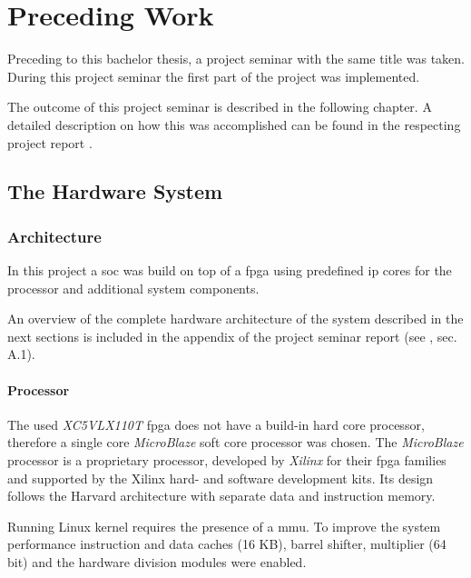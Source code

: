 \chapter{Preceding Work}
\label{cha:preceding}

Preceding to this bachelor thesis, a project seminar with the same title was taken. During this project seminar the first part of the project was implemented.

The outcome of this project seminar is described in the following chapter. A detailed description on how this was accomplished can be found in the respecting project report \cite{projectseminar}.
\\

\section{The Hardware System}

\subsection{Architecture}

In this project a \gls{soc} was build on top of a \gls{fpga} using predefined \gls{ip} cores for the processor and additional system components.

An overview of the complete hardware architecture of the system described in the next sections is included in the appendix of the project seminar report (see \cite{projectseminar}, sec. A.1).
\\

\subsubsection{Processor}
\label{subsubsec:microblaze}

The used \textit{XC5VLX110T} \gls{fpga} does not have a build-in hard core processor, therefore a single core \textit{MicroBlaze} soft core processor was chosen. The \textit{MicroBlaze} processor is a proprietary processor, developed by \textit{Xilinx} for their \gls{fpga} families and supported by the Xilinx hard- and software development kits. Its design follows the Harvard architecture with separate data and instruction memory.

Running Linux kernel requires the presence of a \gls{mmu}. To improve the system performance instruction and data caches (16 KB), barrel shifter, multiplier (64 bit) and the hardware division modules were enabled.
\\

